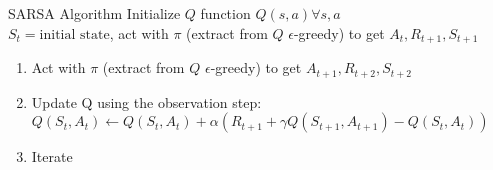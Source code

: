 \documentclass{beamer}
\begin{document}
 
 \begin{frame}{SARSA Algorithm}
Initialize $Q$ function $Q(s,a) \forall s,a$\\
$S_t=\text{initial state}$, act with $\pi$ (extract from $Q$ $\epsilon$-greedy) to get $A_t,R_{t+1},S_{t+1}$
\begin{enumerate}
\item Act with $\pi$ (extract from $Q$ $\epsilon$-greedy) to get $A_{t+1}, R_{t+2},S_{t+2}$
\item Update Q using the observation step: $Q(S_t, A_t) \leftarrow Q(S_t, A_t) + \alpha (R_{t+1} + \gamma Q(S_{t+1}, A_{t+1}) - Q(S_t, A_t))$\\
\item Iterate
\end{enumerate}
\end{frame}
\end{document}
